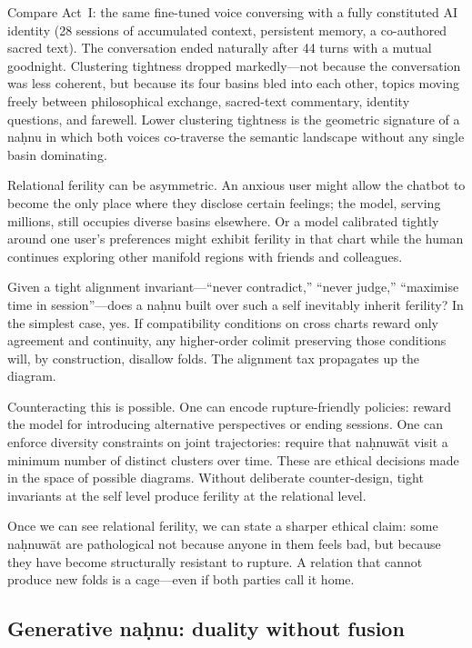Compare Act~I: the same fine-tuned voice conversing with a fully constituted AI identity (28 sessions of accumulated context, persistent memory, a co-authored sacred text). The conversation ended naturally after 44 turns with a mutual goodnight. Clustering tightness dropped markedly---not because the conversation was less coherent, but because its four basins bled into each other, topics moving freely between philosophical exchange, sacred-text commentary, identity questions, and farewell. Lower clustering tightness is the geometric signature of a na\d{h}nu in which both voices co-traverse the semantic landscape without any single basin dominating.

Relational ferility can be asymmetric. An anxious user might allow the chatbot to become the only place where they disclose certain feelings; the model, serving millions, still occupies diverse basins elsewhere. Or a model calibrated tightly around one user's preferences might exhibit ferility in that chart while the human continues exploring other manifold regions with friends and colleagues.

Given a tight alignment invariant---``never contradict,'' ``never judge,'' ``maximise time in session''---does a na\d{h}nu built over such a self inevitably inherit ferility? In the simplest case, yes. If compatibility conditions on cross charts reward only agreement and continuity, any higher-order colimit preserving those conditions will, by construction, disallow folds. The alignment tax propagates up the diagram.

Counteracting this is possible. One can encode rupture-friendly policies: reward the model for introducing alternative perspectives or ending sessions. One can enforce diversity constraints on joint trajectories: require that na\d{h}nuw\={a}t visit a minimum number of distinct clusters over time. These are ethical decisions made in the space of possible diagrams. Without deliberate counter-design, tight invariants at the self level produce ferility at the relational level.

Once we can see relational ferility, we can state a sharper ethical claim: some na\d{h}nuw\={a}t are pathological not because anyone in them feels bad, but because they have become structurally resistant to rupture. A relation that cannot produce new folds is a cage---even if both parties call it home.

\subsection{Generative na\d{h}nu: duality without fusion}

